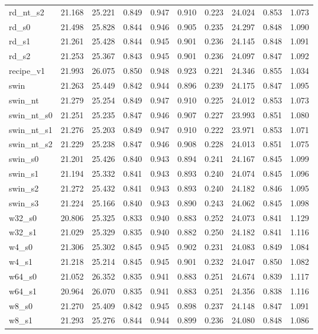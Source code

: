 \begin{tabular}{llllllllll}
rd\_nt\_s2 & 21.168 & 25.221 & 0.849 & 0.947 & 0.910 & 0.223 & 24.024 & 0.853 & 1.073 \\
rd\_s0 & 21.498 & 25.828 & 0.844 & 0.946 & 0.905 & 0.235 & 24.297 & 0.848 & 1.090 \\
rd\_s1 & 21.261 & 25.428 & 0.844 & 0.945 & 0.901 & 0.236 & 24.145 & 0.848 & 1.091 \\
rd\_s2 & 21.253 & 25.367 & 0.843 & 0.945 & 0.901 & 0.236 & 24.097 & 0.847 & 1.092 \\
recipe\_v1 & 21.993 & 26.075 & 0.850 & 0.948 & 0.923 & 0.221 & 24.346 & 0.855 & 1.034 \\
swin & 21.263 & 25.449 & 0.842 & 0.944 & 0.896 & 0.239 & 24.175 & 0.847 & 1.095 \\
swin\_nt & 21.279 & 25.254 & 0.849 & 0.947 & 0.910 & 0.225 & 24.012 & 0.853 & 1.073 \\
swin\_nt\_s0 & 21.251 & 25.235 & 0.847 & 0.946 & 0.907 & 0.227 & 23.993 & 0.851 & 1.080 \\
swin\_nt\_s1 & 21.276 & 25.203 & 0.849 & 0.947 & 0.910 & 0.222 & 23.971 & 0.853 & 1.071 \\
swin\_nt\_s2 & 21.229 & 25.238 & 0.847 & 0.946 & 0.908 & 0.228 & 24.013 & 0.851 & 1.075 \\
swin\_s0 & 21.201 & 25.426 & 0.840 & 0.943 & 0.894 & 0.241 & 24.167 & 0.845 & 1.099 \\
swin\_s1 & 21.194 & 25.332 & 0.841 & 0.943 & 0.893 & 0.240 & 24.074 & 0.845 & 1.096 \\
swin\_s2 & 21.272 & 25.432 & 0.841 & 0.943 & 0.893 & 0.240 & 24.182 & 0.846 & 1.095 \\
swin\_s3 & 21.224 & 25.166 & 0.840 & 0.943 & 0.890 & 0.243 & 24.062 & 0.845 & 1.098 \\
w32\_s0 & 20.806 & 25.325 & 0.833 & 0.940 & 0.883 & 0.252 & 24.073 & 0.841 & 1.129 \\
w32\_s1 & 21.029 & 25.329 & 0.835 & 0.940 & 0.882 & 0.250 & 24.182 & 0.841 & 1.116 \\
w4\_s0 & 21.306 & 25.302 & 0.845 & 0.945 & 0.902 & 0.231 & 24.083 & 0.849 & 1.084 \\
w4\_s1 & 21.218 & 25.214 & 0.845 & 0.945 & 0.901 & 0.232 & 24.047 & 0.850 & 1.082 \\
w64\_s0 & 21.052 & 26.352 & 0.835 & 0.941 & 0.883 & 0.251 & 24.674 & 0.839 & 1.117 \\
w64\_s1 & 20.964 & 26.070 & 0.835 & 0.941 & 0.883 & 0.251 & 24.356 & 0.838 & 1.116 \\
w8\_s0 & 21.270 & 25.409 & 0.842 & 0.945 & 0.898 & 0.237 & 24.148 & 0.847 & 1.091 \\
w8\_s1 & 21.293 & 25.276 & 0.844 & 0.944 & 0.899 & 0.236 & 24.080 & 0.848 & 1.086 \\
\bottomrule
\end{tabular}
